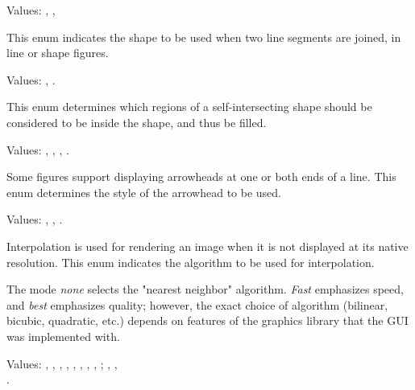 Values: , , 

This enum indicates the shape to be used when two line segments are joined,
in line or shape figures.

\begin{center}
\end{center}


Values: , .

This enum determines which regions of a self-intersecting shape
should be considered to be inside the shape, and thus be filled.

\begin{center}
\end{center}


Values: , , , .

Some figures support displaying arrowheads at one or both ends of a line.
This enum determines the style of the arrowhead to be used.

\begin{center}
\end{center}


Values: , , .

Interpolation is used for rendering an image when it is not displayed at
its native resolution. This enum indicates the algorithm to be used for
interpolation.

The mode \textit{none} selects the "nearest neighbor" algorithm.
\textit{Fast} emphasizes speed, and \textit{best} emphasizes quality;
however, the exact choice of algorithm (bilinear, bicubic, quadratic, etc.)
depends on features of the graphics library that the GUI was implemented with.


Values:
, , , , ,
, , , ;
, , \\ .

